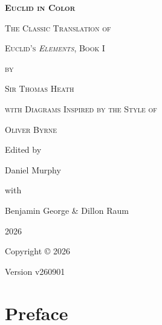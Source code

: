 \documentclass[12pt, twoside]{memoir}
\newcommand{\bookversion}{v260901
} %
\begin{document}
\label{Title Page}
\begin{titlingpage}
    \centering
    \vspace*{2cm}
    {\fontsize{36pt}{40pt}\scshape\bfseries Euclid in Color\par}
    \vspace*{3cm}
    {\normalsize\scshape The Classic Translation of\par}
    {\Huge\scshape Euclid's \textit{Elements}, Book I\par}
    \vspace{0.2cm}
    {\normalsize\scshape by\par}
	{\Large\scshape Sir Thomas Heath\par}
    \vspace{0.3cm}
    {\normalsize\scshape with Diagrams Inspired by the Style of \par}
    {\Large\scshape Oliver Byrne\par}
    \vspace{2cm}
    {\large Edited by\par}
    \vspace{0.2cm}
    {\Large Daniel Murphy\par}
    \vspace{0.6cm}
    {\large with\par}
    \vspace{0.2cm}
    {\large Benjamin George \& Dillon Raum\par}
    \vfill
    {\Large 2026\par}
\end{titlingpage}


\vspace*{\fill}
\begin{center}
Copyright © 2026 \par
Version \bookversion
\end{center}
\vspace*{\fill}

\clearpage

\frontmatter %

\tableofcontents
\clearforchapter

\setlength{\parindent}{20pt} %
\label{Preface}
\chapter*{Preface}
\end{document}
